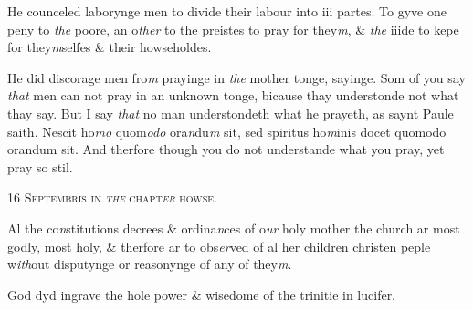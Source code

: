 \documentclass[12pt, a4paper]{book}
\begin{document}
				\marginpar[\vspace{0.5cm}{\textcolor{Gray}{n}}]{}
			
		\ifthenelse{\isodd{\thepage}}
		{\reversemarginpar}
		{\normalmarginpar}
		He counceled laborynge men to divide their labour into
 iii partes. To gyve one peny to \textit{the} poore, an o\textit{ther} to the
 preistes to pray for they\textit{m}, \& \textit{the }iiide to kepe for they\textit{m}selfes
 \& their howseholdes.
 
				\marginpar[\vspace{0.5cm}{\textcolor{Gray}{n}}]{}
			
		\ifthenelse{\isodd{\thepage}}
		{\reversemarginpar}
		{\normalmarginpar}
		He did discorage men fro\textit{m} prayinge in \textit{the} mother tonge,
 sayinge. Som of you say \textit{that} men can not pray in an
 unknown tonge, bicause thay understonde not what
 thay say. But I say \textit{that} no man understondeth what
 he prayeth, as saynt Paule saith. Nescit ho\textit{mo} quom\textit{odo} ora\textit{n}du\textit{m}
 sit, sed spiritus ho\textit{m}inis docet quomodo orandum sit. And therfore
 though you do not understande what you pray, yet
 pray so stil.
 

               
                  
				\begin{center}  {\scshape 
                     16 Septembris in \textit{the} chapt\textit{er} howse.}  \end{center}
			

               	
				\marginpar[\vspace{0.5cm}{\textcolor{Gray}{decrees}}]{}
			
				\marginpar[\vspace{0.5cm}{\textcolor{Gray}{n}}]{}
			
		\ifthenelse{\isodd{\thepage}}
		{\reversemarginpar}
		{\normalmarginpar}
		Al the co\textit{n}stitutions decrees \& ordina\textit{n}ces of o\textit{ur} holy mother
 the church ar most godly, most holy, \& therfore ar to
 obs\textit{er}ved of al her children christen peple w\textit{ith}out
 disputynge or reasonynge of any of they\textit{m}.
 
				\marginpar[\vspace{0.5cm}{\textcolor{Gray}{n}}]{}
			
		\ifthenelse{\isodd{\thepage}}
		{\reversemarginpar}
		{\normalmarginpar}
		God dyd ingrave the hole power \& wisedome of the
 trinitie in lucifer.
\end{document}
